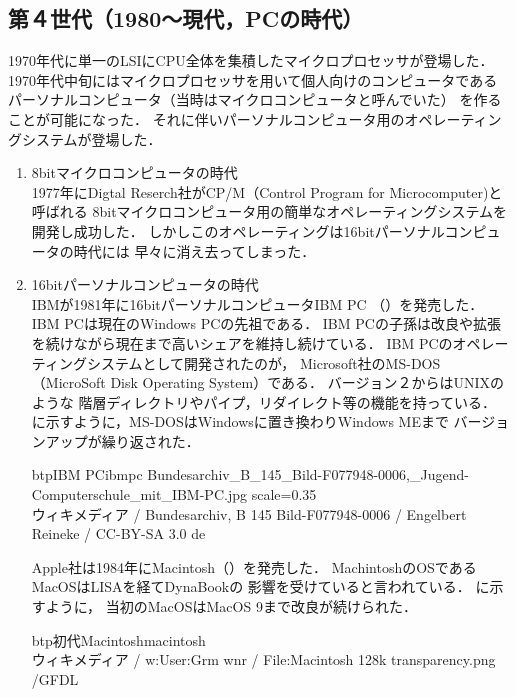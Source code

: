 \subsection{第４世代（1980〜現代，PCの時代）}

1970年代に単一のLSIにCPU全体を集積したマイクロプロセッサが登場した．
1970年代中旬にはマイクロプロセッサを用いて個人向けのコンピュータである
パーソナルコンピュータ（当時はマイクロコンピュータと呼んでいた）
を作ることが可能になった．
それに伴いパーソナルコンピュータ用のオペレーティングシステムが登場した．

\begin{enumerate}
\item 8bitマイクロコンピュータの時代 \\
1977年にDigtal Reserch社がCP/M（Control Program for Microcomputer)と呼ばれる
8bitマイクロコンピュータ用の簡単なオペレーティングシステムを
開発し成功した．
しかしこのオペレーティングは16bitパーソナルコンピュータの時代には
早々に消え去ってしまった\cite{fourth}．

\item 16bitパーソナルコンピュータの時代 \\
IBMが1981年に16bitパーソナルコンピュータIBM PC\cite{ibmpc81}
（）を発売した．
IBM PCは現在のWindows PCの先祖である．
IBM PCの子孫は改良や拡張を続けながら現在まで高いシェアを維持し続けている．
IBM PCのオペレーティングシステムとして開発されたのが，
Microsoft社のMS-DOS（MicroSoft Disk Operating System）\cite{msdos}である．
バージョン２からはUNIXのような
階層ディレクトリやパイプ，リダイレクト等の機能を持っている．
に示すように，MS-DOSはWindowsに置き換わりWindows MEまで
バージョンアップが繰り返された．

\begin{myfig}{btp}{IBM PC}{ibmpc}
\myincludegraphics
{Bundesarchiv_B_145_Bild-F077948-0006,_Jugend-Computerschule_mit_IBM-PC.jpg}
{scale=0.35}\\
{\small
ウィキメディア /
Bundesarchiv, B 145 Bild-F077948-0006 / Engelbert Reineke / CC-BY-SA 3.0 de}
\end{myfig}

Apple社は1984年にMacintosh（）を発売した．
MachintoshのOSであるMacOSはLISAを経てDynaBook\cite{key72, key72J}の
影響を受けていると言われている\cite{fourth}．
に示すように，
当初のMacOSはMacOS 9\cite{classicmacos}まで改良が続けられた．

\begin{myfig}{btp}{初代Macintosh}{macintosh}
\\
{\small
ウィキメディア / w:User:Grm wnr / File:Macintosh 128k transparency.png /GFDL}
\end{myfig}


\end{enumerate}
